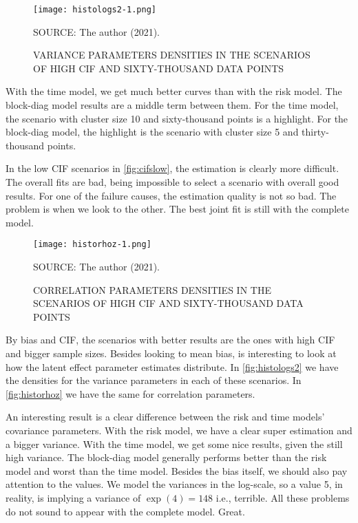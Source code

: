 \begin{figure}[H]
 \setlength{\abovecaptionskip}{.0001pt}
 \caption{VARIANCE PARAMETERS DENSITIES IN THE SCENARIOS OF HIGH CIF AND
          SIXTY-THOUSAND DATA POINTS}
 \vspace{0.2cm}\centering
 \texttt{[image: histologs2-1.png]}\\
 \begin{footnotesize}
  SOURCE: The author (2021).
 \end{footnotesize}
 \label{fig:histologs2}
\end{figure}

With the time model, we get much better curves than with the risk
model. The block-diag model results are a middle term between them. For
the time model, the scenario with cluster size 10 and sixty-thousand
points is a highlight. For the block-diag model, the highlight is the
scenario with cluster size 5 and thirty-thousand points.

In the low CIF scenarios in \autoref{fig:cifslow}, the estimation is
clearly more difficult. The overall fits are bad, being impossible to
select a scenario with overall good results. For one of the failure
causes, the estimation quality is not so bad. The problem is when we
look to the other. The best joint fit is still with the complete model.

\begin{figure}[H]
 \setlength{\abovecaptionskip}{.0001pt}
 \caption{CORRELATION PARAMETERS DENSITIES IN THE SCENARIOS OF HIGH CIF
          AND SIXTY-THOUSAND DATA POINTS}
 \vspace{0.2cm}\centering
 \texttt{[image: historhoz-1.png]}\\
 \begin{footnotesize}
  SOURCE: The author (2021).
 \end{footnotesize}
 \label{fig:historhoz}
\end{figure}

By bias and CIF, the scenarios with better results are the ones with
high CIF and bigger sample sizes. Besides looking to mean bias, is
interesting to look at how the latent effect parameter estimates
distribute. In \autoref{fig:histologs2} we have the densities for the
variance parameters in each of these scenarios. In
\autoref{fig:historhoz} we have the same for correlation parameters.

An interesting result is a clear difference between the risk and time
models' covariance parameters. With the risk model, we have a clear
super estimation and a bigger variance. With the time model, we get some
nice results, given the still high variance. The block-diag model
generally performs better than the risk model and worst than the time
model. Besides the bias itself, we should also pay attention to the
values. We model the variances in the log-scale, so a value 5, in
reality, is implying a variance of \(\exp(4) = 148\) i.e., terrible. All
these problems do not sound to appear with the complete model. Great.

